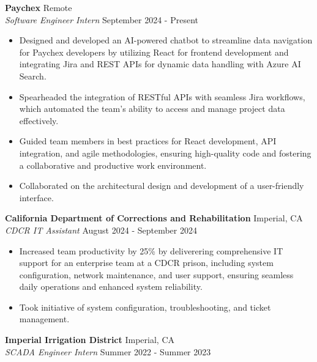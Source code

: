 \documentclass[a4paper]{article}
\begin{document}
\textbf{Paychex} \hfill Remote\\
\textit{Software Engineer Intern} \hfill September 2024 - Present\\
\vspace{-1mm}
\begin{itemize} \itemsep 1pt
	\item Designed and developed an AI-powered chatbot to streamline data navigation for Paychex developers by utilizing React for frontend development and integrating Jira and REST APIs for dynamic data handling with Azure AI Search.
	\item Spearheaded the integration of RESTful APIs with seamless Jira workflows, which automated the team’s ability to access and manage project data effectively.
	\item Guided team members in best practices for React development, API integration, and agile methodologies, ensuring high-quality code and fostering a collaborative and productive work environment.
	\item Collaborated on the architectural design and development of a user-friendly interface.
\end{itemize}
\textbf{California Department of Corrections and Rehabilitation} \hfill Imperial, CA\\
\textit{CDCR IT Assistant} \hfill August 2024 - September 2024\\
\vspace{-1mm}
\begin{itemize} \itemsep 1pt
	\item Increased team productivity by 25\% by deliverering comprehensive IT support for an enterprise team at a CDCR prison, including system configuration, network maintenance, and user support, ensuring seamless daily operations and enhanced system reliability.
	\item Took initiative of system configuration, troubleshooting, and ticket management.
\end{itemize}
\textbf{Imperial Irrigation District} \hfill Imperial, CA\\
\textit{SCADA Engineer Intern} \hfill Summer 2022 - Summer 2023\\
\vspace{-1mm}
\end{document}
